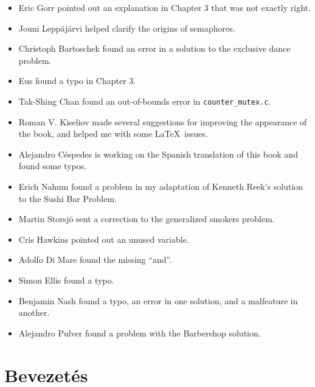 \documentclass{book}
\newcommand{\clearemptydoublepage}{\newpage\cleardoublepage}
\begin{document}
\begin{itemize}
\item Eric Gorr pointed out an explanation in Chapter 3 that was
not exactly right.

\item Jouni Lepp\"{a}j\"{a}rvi helped clarify the origins of semaphores.

\item Christoph Bartoschek found an error in a solution to
the exclusive dance problem.

\item Eus found a typo in Chapter 3.

\item Tak-Shing Chan found an out-of-bounds error in {\tt counter\_mutex.c}.

\item Roman V. Kiseliov made several suggestions for improving
the appearance of the book, and helped me with some \LaTeX~issues.

\item Alejandro C\'{e}spedes is working on the Spanish translation of this
book and found some typos.

\item Erich Nahum found a problem in my adaptation of Kenneth Reek's
  solution to the Sushi Bar Problem.

\item Martin Storsj\"{o} sent a correction to the generalized smokers problem.

\item Cris Hawkins pointed out an unused variable.

\item Adolfo Di Mare found the missing ``and''.

\item Simon Ellis found a typo.

\item Benjamin Nash found a typo, an error in one solution, and
a malfeature in another.

\item Alejandro Pulver found a problem with the Barbershop solution.

\end{itemize}


\tableofcontents
\clearemptydoublepage

\mainmatter


\chapter{Bevezetés}
\end{document}

